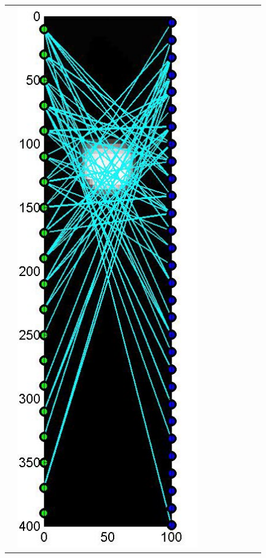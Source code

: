 \documentclass[11pt]{article}
\begin{document}
{\begin{figure}[!h]
\begin{center}
\begin{tabular}{|c|c|c|c|c|c|c|c|c|}
			&
			\includegraphics[width=.9\iwidth]{figures/newFigs/noisy/resultsExp-2-designs}
			&

\end{tabular}
\end{center}
\end{figure}}
\end{document}
